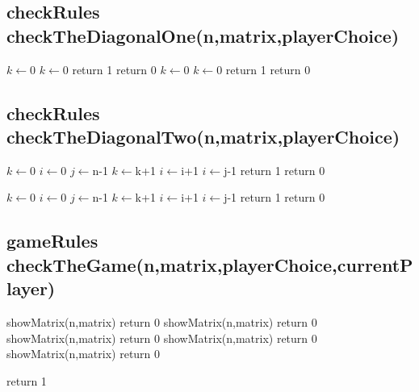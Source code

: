 \documentclass[12]{article}
\begin{document}
\subsection{checkRules checkTheDiagonalOne(n,matrix,playerChoice)}
\begin{algorithmic}[1]

	\STATE $k \gets $0
				\STATE $k \gets $0
			\ENDIF
		\ENDFOR
	\ENDFOR
\ENDIF
{}
	\STATE return 1
\ENDIF
	\STATE return 0
	\STATE $k \gets $0
				\STATE $k \gets $0
			\ENDIF
		\ENDFOR
	\ENDFOR
\ENDIF
{}
	\STATE return 1
\ENDIF
	\STATE return 0


\end{algorithmic}

\subsection{checkRules checkTheDiagonalTwo(n,matrix,playerChoice)}
\begin{algorithmic}[1]

	\STATE $k \gets $0
	\STATE $i \gets $0
	\STATE $j \gets $n-1
			\STATE $k \gets $k+1
		\ENDIF
		\STATE $i \gets $i+1
		\STATE $i \gets $j-1	
	\ENDWHILE
		\STATE return 1
	\ENDIF
		\STATE return 0
\ENDIF

	\STATE $k \gets $0
	\STATE $i \gets $0
	\STATE $j \gets $n-1
			\STATE $k \gets $k+1
		\ENDIF
		\STATE $i \gets $i+1
		\STATE $i \gets $j-1	
	\ENDWHILE
		\STATE return 1
	\ENDIF
		\STATE return 0
\ENDIF

\end{algorithmic}

\subsection{gameRules checkTheGame(n,matrix,playerChoice,currentPlayer)}
\begin{algorithmic}[1]

	\STATE showMatrix(n,matrix)
	\STATE return 0
\ENDIF
{}
	\STATE showMatrix(n,matrix)
	\STATE return 0
\ENDIF
{}
	\STATE showMatrix(n,matrix)
	\STATE return 0
\ENDIF
{}
	\STATE showMatrix(n,matrix)
	\STATE return 0
\ENDIF
{}
	\STATE showMatrix(n,matrix)
	\STATE return 0
\ENDIF

 
\STATE return 1

\end{algorithmic}
\end{document}
